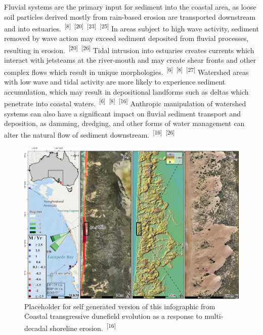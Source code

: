 \documentclass{article}
\begin{document}
\par{Fluvial systems are the primary input for sediment into the coastal area, as loose soil particles derived mostly from rain-based erosion are transported downstream and into estuaries.~\textsuperscript{[8]}~\textsuperscript{[20]}~\textsuperscript{[23]}~\textsuperscript{[25]} In areas subject to high wave activity, sediment removed by wave action may exceed sediment deposited from fluvial processes, resulting in erosion.~\textsuperscript{[20]}~\textsuperscript{[26]} Tidal intrusion into estuaries creates currents which interact with jetsteams at the river-mouth and may create shear fronts and other complex flows which result in unique morphologies.~\textsuperscript{[6]}~\textsuperscript{[8]}~\textsuperscript{[27]} Watershed areas with low wave and tidal activity are more likely to experience sediment accumulation, which may result in depositional landforms such as deltas which penetrate into coastal waters.~\textsuperscript{[6]}~\textsuperscript{[8]}~\textsuperscript{[16]} Anthropic manipulation of watershed systems can also have a significant impact on fluvial sediment transport and deposition, as damming, dredging, and other forms of water management can alter the natural flow of sediment downstream.~\textsuperscript{[16]}~\textsuperscript{[26]}}


\begin{figure}
    \centering
    \includegraphics[width=.9\linewidth]{images/dunes.jpg}
    \caption{Placeholder for self generated version of this infographic from Coastal transgressive dunefield evolution as a response to multi-decadal shoreline erosion.~\textsuperscript{[16]}}
    \label{figure8}
\end{figure}
\end{document}
